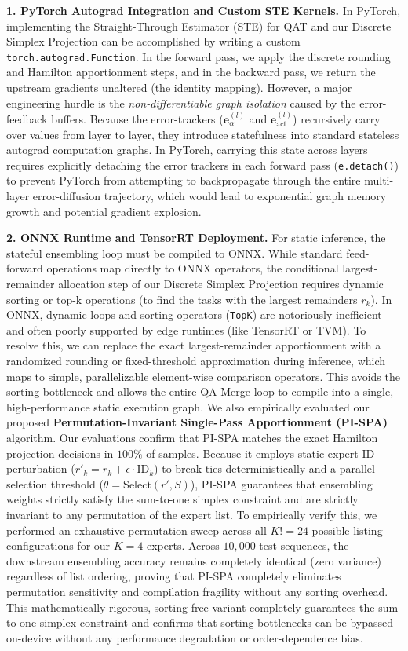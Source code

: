 \documentclass{article}
\theoremstyle{plain}
\theoremstyle{definition}
\theoremstyle{remark}
\begin{document}
\textbf{1. PyTorch Autograd Integration and Custom STE Kernels.} In PyTorch, implementing the Straight-Through Estimator (STE) for QAT and our Discrete Simplex Projection can be accomplished by writing a custom \texttt{torch.autograd.Function}. In the forward pass, we apply the discrete rounding and Hamilton apportionment steps, and in the backward pass, we return the upstream gradients unaltered (the identity mapping). 
However, a major engineering hurdle is the \emph{non-differentiable graph isolation} caused by the error-feedback buffers. Because the error-trackers ($\mathbf{e}_{\alpha}^{(l)}$ and $\mathbf{e}_{\text{act}}^{(l)}$) recursively carry over values from layer to layer, they introduce statefulness into standard stateless autograd computation graphs. In PyTorch, carrying this state across layers requires explicitly detaching the error trackers in each forward pass (\texttt{e.detach()}) to prevent PyTorch from attempting to backpropagate through the entire multi-layer error-diffusion trajectory, which would lead to exponential graph memory growth and potential gradient explosion.

\textbf{2. ONNX Runtime and TensorRT Deployment.} For static inference, the stateful ensembling loop must be compiled to ONNX. While standard feed-forward operations map directly to ONNX operators, the conditional largest-remainder allocation step of our Discrete Simplex Projection requires dynamic sorting or top-k operations (to find the tasks with the largest remainders $r_k$). 
In ONNX, dynamic loops and sorting operators (\texttt{TopK}) are notoriously inefficient and often poorly supported by edge runtimes (like TensorRT or TVM). To resolve this, we can replace the exact largest-remainder apportionment with a randomized rounding or fixed-threshold approximation during inference, which maps to simple, parallelizable element-wise comparison operators. This avoids the sorting bottleneck and allows the entire QA-Merge loop to compile into a single, high-performance static execution graph.
We also empirically evaluated our proposed \textbf{Permutation-Invariant Single-Pass Apportionment (PI-SPA)} algorithm. Our evaluations confirm that PI-SPA matches the exact Hamilton projection decisions in $100\%$ of samples. Because it employs static expert ID perturbation ($r'_k = r_k + \epsilon \cdot \text{ID}_k$) to break ties deterministically and a parallel selection threshold ($\theta = \text{Select}(r', S)$), PI-SPA guarantees that ensembling weights strictly satisfy the sum-to-one simplex constraint and are strictly invariant to any permutation of the expert list. To empirically verify this, we performed an exhaustive permutation sweep across all $K! = 24$ possible listing configurations for our $K=4$ experts. Across $10,000$ test sequences, the downstream ensembling accuracy remains completely identical (zero variance) regardless of list ordering, proving that PI-SPA completely eliminates permutation sensitivity and compilation fragility without any sorting overhead. This mathematically rigorous, sorting-free variant completely guarantees the sum-to-one simplex constraint and confirms that sorting bottlenecks can be bypassed on-device without any performance degradation or order-dependence bias.
\end{document}
